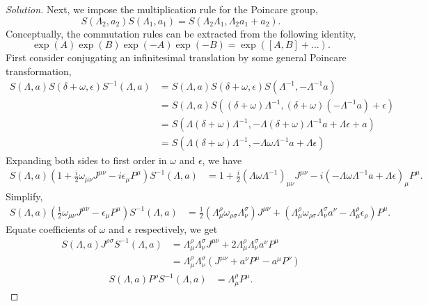 \begin{proof}[Solution]
	Next, we impose the multiplication rule for the Poincare group,
	\[
	S(\Lambda_2, a_2) S(\Lambda_1, a_1) = S(\Lambda_2 \Lambda_1, \Lambda_2 a_1 + a_2).
	\]
	Conceptually, the commutation rules can be extracted from the following identity,
	\[
	\exp(A) \exp(B) \exp(-A) \exp(-B) = \exp([A, B] + \ldots).
	\]
	First consider conjugating an infinitesimal translation by some general Poincare transformation,
	\begin{align*}
	S(\Lambda, a) S(\delta + \omega, \epsilon) S^{-1}(\Lambda, a) 
	&= S(\Lambda, a) S(\delta + \omega, \epsilon) S(\Lambda^{-1}, -\Lambda^{-1} a)\\
	&= S(\Lambda, a) S((\delta + \omega) \Lambda^{-1}, (\delta + \omega)(-\Lambda^{-1} a) + \epsilon)\\
	&= S(\Lambda (\delta + \omega) \Lambda^{-1}, - \Lambda (\delta + \omega) \Lambda^{-1} a + \Lambda \epsilon + a)\\
	&= S(\Lambda (\delta + \omega) \Lambda^{-1}, - \Lambda \omega \Lambda^{-1} a + \Lambda \epsilon)
	\end{align*}
	Expanding both sides to first order in $\omega$ and $\epsilon$, we have
	\begin{align*}
		S(\Lambda, a) (1 + \frac{i}{2} \omega_{\mu \nu} J^{\mu \nu} - i \epsilon_\mu P^\mu) S^{-1}(\Lambda, a)
		&= 1 + \frac{i}{2} (\Lambda \omega \Lambda^{-1})_{\mu \nu} J^{\mu \nu} - i (- \Lambda \omega \Lambda^{-1} a + \Lambda \epsilon)_\mu P^\mu.
	\end{align*}
	Simplify,
	\begin{align*}
		S(\Lambda, a) (\frac{1}{2} \omega_{\mu \nu} J^{\mu \nu} - \epsilon_\mu P^\mu) S^{-1}(\Lambda, a)
		&= \frac{1}{2} (\Lambda^\rho _ \mu \omega _{\rho \sigma} \Lambda^\sigma _ \nu) J^{\mu \nu} + (\Lambda^\rho _ \mu \omega_{\rho \sigma} \Lambda^\sigma _ \nu a^\nu - \Lambda^\rho _ \mu \epsilon_\rho) P^\mu.
	\end{align*}
	Equate coefficients of $\omega$ and $\epsilon$ respectively, we get
	\begin{align}
		\label{eq:4-1}
		S(\Lambda, a) J^{\rho \sigma} S^{-1}(\Lambda, a) 
		&= \Lambda^\rho _ \mu \Lambda^\sigma _ \nu J^{\mu \nu} + 2 \Lambda^\rho _ \mu \Lambda^\sigma _ \nu a^\nu P^\mu \nonumber \\
		&= \Lambda^\rho _ \mu \Lambda^\sigma _ \nu \left(J^{\mu \nu} + a^\nu P^\mu - a^\mu P^\nu\right)
	\end{align}
	\begin{align}
		\label{eq:4-2}
		S(\Lambda, a) P^\rho S^{-1}(\Lambda, a) 
		&= \Lambda^\rho _ \mu P^\mu.

\end{align}
\end{proof}
